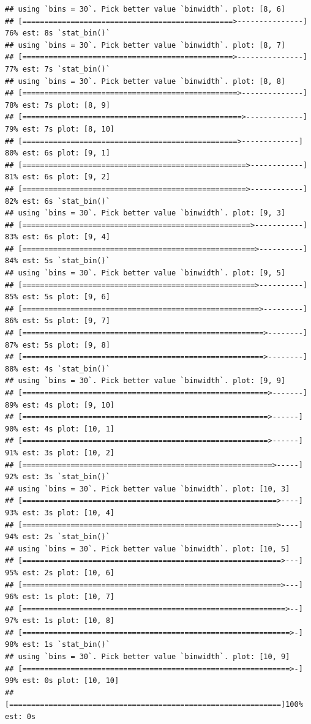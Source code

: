 \documentclass[
]{article}
\begin{document}
\begin{verbatim}
## using `bins = 30`. Pick better value `binwidth`. plot: [8, 6]
## [================================================>---------------] 76% est: 8s `stat_bin()`
## using `bins = 30`. Pick better value `binwidth`. plot: [8, 7]
## [================================================>---------------] 77% est: 7s `stat_bin()`
## using `bins = 30`. Pick better value `binwidth`. plot: [8, 8]
## [=================================================>--------------] 78% est: 7s plot: [8, 9]
## [==================================================>-------------] 79% est: 7s plot: [8, 10]
## [=================================================>-------------] 80% est: 6s plot: [9, 1]
## [===================================================>------------] 81% est: 6s plot: [9, 2]
## [===================================================>------------] 82% est: 6s `stat_bin()`
## using `bins = 30`. Pick better value `binwidth`. plot: [9, 3]
## [====================================================>-----------] 83% est: 6s plot: [9, 4]
## [=====================================================>----------] 84% est: 5s `stat_bin()`
## using `bins = 30`. Pick better value `binwidth`. plot: [9, 5]
## [=====================================================>----------] 85% est: 5s plot: [9, 6]
## [======================================================>---------] 86% est: 5s plot: [9, 7]
## [=======================================================>--------] 87% est: 5s plot: [9, 8]
## [=======================================================>--------] 88% est: 4s `stat_bin()`
## using `bins = 30`. Pick better value `binwidth`. plot: [9, 9]
## [========================================================>-------] 89% est: 4s plot: [9, 10]
## [========================================================>------] 90% est: 4s plot: [10, 1]
## [========================================================>------] 91% est: 3s plot: [10, 2]
## [=========================================================>-----] 92% est: 3s `stat_bin()`
## using `bins = 30`. Pick better value `binwidth`. plot: [10, 3]
## [==========================================================>----] 93% est: 3s plot: [10, 4]
## [==========================================================>----] 94% est: 2s `stat_bin()`
## using `bins = 30`. Pick better value `binwidth`. plot: [10, 5]
## [===========================================================>---] 95% est: 2s plot: [10, 6]
## [===========================================================>---] 96% est: 1s plot: [10, 7]
## [============================================================>--] 97% est: 1s plot: [10, 8]
## [=============================================================>-] 98% est: 1s `stat_bin()`
## using `bins = 30`. Pick better value `binwidth`. plot: [10, 9]
## [=============================================================>-] 99% est: 0s plot: [10, 10]
## [==============================================================]100% est: 0s
\end{verbatim}
\end{document}
